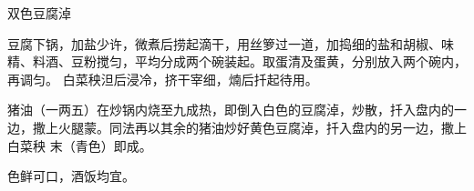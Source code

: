 %
%
%
%
%
%
%
\begin{recipe}[鸳鸯豆腐淖]{双色豆腐淖}

\ingredients


\preparation

\step 豆腐下锅，加盐少许，微煮后捞起滴干，用丝箩过一道，加捣细的盐和胡椒、味
精、料酒、豆粉搅匀，平均分成两个碗装起。取蛋清及蛋黄，分别放入两个碗内，再调匀。
白菜秧泹后浸冷，挤干宰细，煵后扦起待用。

\step 猪油（一两五）在炒锅内烧至九成热，即倒入白色的豆腐淖，炒散，扦入盘内的一
边，撒上火腿蒙。同法再以其余的猪油炒好黄色豆腐淖，扦入盘内的另一边，撒上白菜秧
末（青色）即成。

\features

色鲜可口，酒饭均宜。

\end{recipe}

